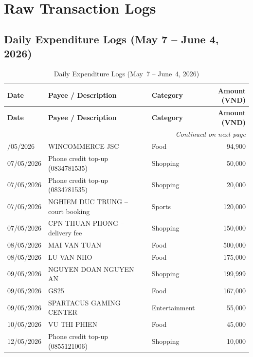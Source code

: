 \chapter{Raw Transaction Logs}

\section{Daily Expenditure Logs (May 7 -- June 4, 2026)}

{\small\centering
\begin{longtable}{lp{6.2cm}lr}
\caption{Daily Expenditure Logs (May~7 -- June~4, 2026)} \label{tab:daily_logs} \\
\toprule
\textbf{Date} & \textbf{Payee / Description} & \textbf{Category} & \textbf{Amount (VND)} \\
\midrule
\endfirsthead
\toprule
\textbf{Date} & \textbf{Payee / Description} & \textbf{Category} & \textbf{Amount (VND)} \\
\midrule
\endhead
\midrule
\multicolumn{4}{r}{\textit{Continued on next page}} \\
\endfoot
\bottomrule
\endlastfoot
07/05/2026 & WINCOMMERCE JSC                       & Food            &  94,900 \\
07/05/2026 & Phone credit top-up (0834781535)      & Shopping        &  50,000 \\
07/05/2026 & Phone credit top-up (0834781535)      & Shopping        &  20,000 \\
07/05/2026 & NGHIEM DUC TRUNG -- court booking     & Sports          & 120,000 \\
07/05/2026 & CPN THUAN PHONG -- delivery fee       & Shopping        & 150,000 \\
08/05/2026 & MAI VAN TUAN                          & Food            & 500,000 \\
08/05/2026 & LU VAN NHO                            & Food            & 175,000 \\
09/05/2026 & NGUYEN DOAN NGUYEN AN                 & Shopping        & 199,999 \\
09/05/2026 & GS25                                  & Food            & 167,000 \\
09/05/2026 & SPARTACUS GAMING CENTER               & Entertainment   &  55,000 \\
10/05/2026 & VU THI PHIEN                          & Food            &  45,000 \\
12/05/2026 & Phone credit top-up (0855121006)      & Shopping        &  10,000 \\

\end{longtable}}
